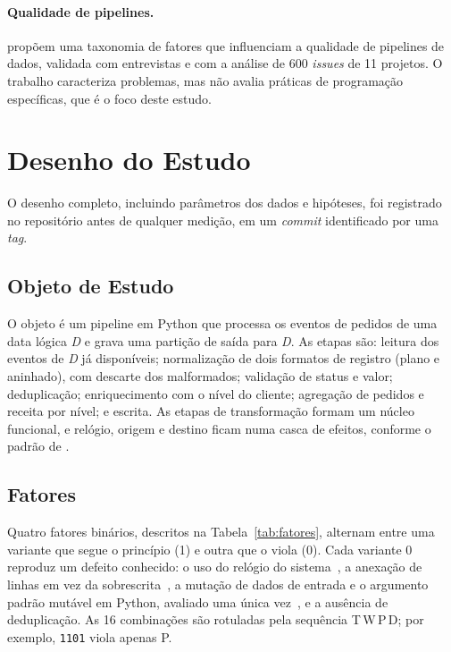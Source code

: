 \paragraph{Qualidade de pipelines.} \citet{foidl2024} propõem uma taxonomia de fatores que influenciam a qualidade de pipelines de dados, validada com entrevistas e com a análise de 600 \emph{issues} de 11 projetos. O trabalho caracteriza problemas, mas não avalia práticas de programação específicas, que é o foco deste estudo.

\section{Desenho do Estudo}

O desenho completo, incluindo parâmetros dos dados e hipóteses, foi registrado no repositório antes de qualquer medição, em um \emph{commit} identificado por uma \emph{tag}.

\subsection{Objeto de Estudo}

O objeto é um pipeline em Python que processa os eventos de pedidos de uma data lógica \emph{D} e grava uma partição de saída para \emph{D}. As etapas são: leitura dos eventos de \emph{D} já disponíveis; normalização de dois formatos de registro (plano e aninhado), com descarte dos malformados; validação de status e valor; deduplicação; enriquecimento com o nível do cliente; agregação de pedidos e receita por nível; e escrita. As etapas de transformação formam um núcleo funcional, e relógio, origem e destino ficam numa casca de efeitos, conforme o padrão de \citet{bernhardt2012}.

\subsection{Fatores}

Quatro fatores binários, descritos na Tabela~\ref{tab:fatores}, alternam entre uma variante que segue o princípio (1) e outra que o viola (0). Cada variante 0 reproduz um defeito conhecido: o uso do relógio do sistema~\citep{airflow2023}, a anexação de linhas em vez da sobrescrita~\citep{airflow2023}, a mutação de dados de entrada e o argumento padrão mutável em Python, avaliado uma única vez~\citep{pythontutorial}, e a ausência de deduplicação. As 16 combinações são rotuladas pela sequência T\,W\,P\,D; por exemplo, \texttt{1101} viola apenas P.

